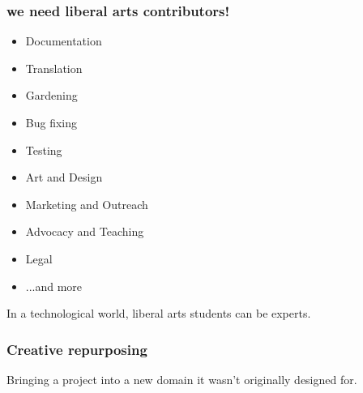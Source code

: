 \begin{frame} 
\frametitle{we need liberal arts contributors!}
\begin{itemize}
	\item Documentation
	\item Translation
	\item Gardening %
	\item Bug fixing
	\item Testing %
	\item Art and Design
	\item Marketing and Outreach
	\item Advocacy and Teaching %
	\item Legal
	\item ...and more
\end{itemize}

\end{frame} 



\begin{frame} 
\huge
\begin{center}
In a technological world,
liberal arts students
can be \alert{experts}. %
\end{center}

\end{frame} 


\begin{frame} 
\frametitle{Creative repurposing}
\huge
\begin{center}
Bringing a project into a \alert{new domain}
it wasn't originally designed for.
\end{center}

\end{frame} 

